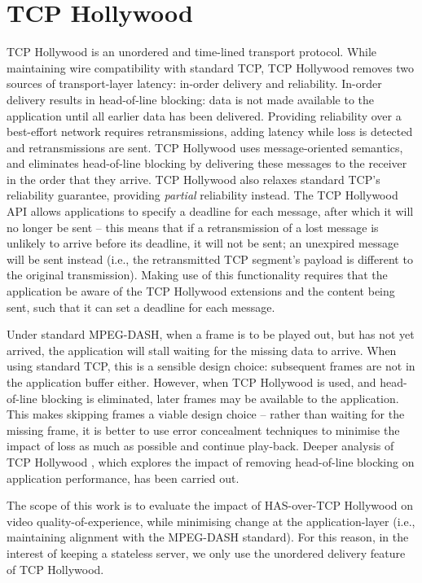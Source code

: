 \section{TCP Hollywood}
\label{sec:hlywd}

TCP Hollywood \cite{mcquistin2016tcp, mcquistin2016tcp2} is an unordered and time-lined transport protocol.
While maintaining wire compatibility with standard TCP, TCP Hollywood removes two sources
of transport-layer latency: in-order delivery and reliability. In-order delivery
results in head-of-line blocking: data is not made available to the application until all 
earlier data has been delivered. Providing
reliability over a best-effort network requires retransmissions, adding latency while
loss is detected and retransmissions are sent. TCP Hollywood uses message-oriented
semantics, and eliminates head-of-line blocking by delivering these messages to the
receiver in the order that they arrive. TCP Hollywood also relaxes standard TCP's
reliability guarantee, providing \emph{partial} reliability instead. The TCP Hollywood
API allows applications to specify a deadline for each message, after which it will no
longer be sent -- this means that if a retransmission of a lost message is unlikely to
arrive before its deadline, it will not be sent; an unexpired message will be sent
instead (i.e., the retransmitted TCP segment's payload is different to the original transmission). 
Making use of this functionality requires that the application be aware of
the TCP Hollywood extensions and the content being sent, such that it can
set a deadline for each message. 

Under standard MPEG-DASH, when a frame is to be played out, but has not yet arrived, the
application will stall waiting for the missing data to arrive. When using standard TCP,
this is a sensible design choice: subsequent frames are not in the application buffer
either. However, when TCP Hollywood is used, and head-of-line blocking is eliminated,
later frames may be available to the application. This makes skipping frames a viable design
choice -- rather than waiting for the missing frame, it is better to use error concealment
techniques to minimise the impact of loss as much as possible and continue play-back. 
Deeper analysis of TCP Hollywood \cite{mcquistin2016tcp, mcquistin2016tcp2}, which
explores the impact of removing head-of-line blocking on application performance, has been
carried out.

The scope of this work is to evaluate the impact of HAS-over-TCP Hollywood on
video quality-of-experience, while minimising change at the application-layer (i.e., maintaining
alignment with the MPEG-DASH standard). For this reason, in the interest of keeping a
stateless server, we only use the unordered delivery feature of TCP Hollywood. 
